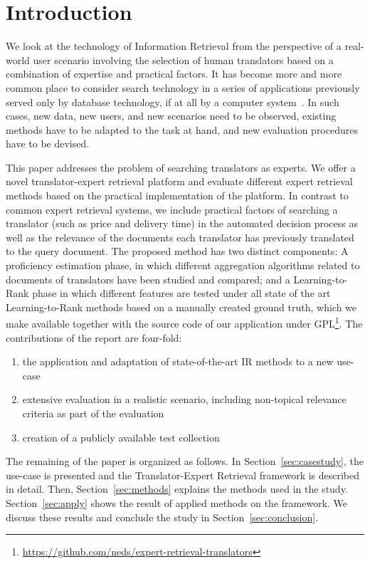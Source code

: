\section{Introduction}
\label{sec:introduction}
We look at the technology of Information Retrieval from the perspective of a real-world user scenario involving the selection of human translators based on a combination of expertise and practical factors. 
It has become more and more common place to consider search technology in a series of applications previously served only by database technology, if at all by a computer system~\cite{Grefenstette:2011}. In such cases, new data, new users, and new scenarios need to be observed, existing methods have to be adapted to the task at hand, and new evaluation procedures have to be devised. 

This paper addresses the problem of searching translators as experts. We offer a novel translator-expert retrieval platform and evaluate different expert retrieval methods based on the practical implementation of the platform. In contrast to common expert retrieval systems, we include practical factors of searching a translator (such as price and delivery time) in the automated decision process as well as the relevance of the documents each translator has previously translated to the query document. The proposed method has two distinct components: A proficiency estimation phase, in which different aggregation algorithms related to documents of translators have been studied and compared; and a Learning-to-Rank phase in which different features are tested under all state of the art Learning-to-Rank methods based on a manually created ground truth, which we make available together with the source code of our application under GPL\footnote{\url{https://github.com/neds/expert-retrieval-translators}}. The contributions of the report are four-fold:
\begin{enumerate}
\item the application and adaptation of state-of-the-art IR methods to a new use-case
\item extensive evaluation in a realistic scenario, including non-topical relevance criteria as part of the evaluation
\item creation of a publicly available test collection
\end{enumerate}

The remaining of the paper is organized as follows. In Section~\ref{sec:casestudy}, the use-case is presented and the Translator-Expert Retrieval framework is described in detail. Then, Section~\ref{sec:methods} explains the methods used in the study. Section~\ref{sec:apply} shows the result of applied methods on the framework. We discuss these results and conclude the study in Section~\ref{sec:conclusion}.
